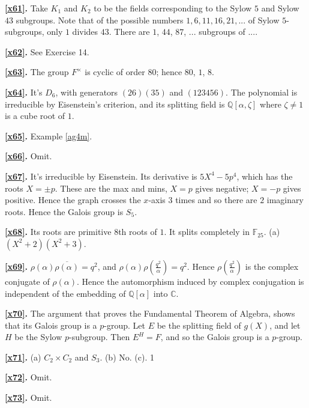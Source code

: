 \documentclass[a4paper,11pt,final,openany]{memoir}
\theoremstyle{nonumberplain}
\begin{document}
\medskip\noindent\textbf{\ref{x61}.} Take $K_{1}$ and $K_{2}$ to be the fields
corresponding to the Sylow $5$ and Sylow $43$ subgroups. Note that of the
possible numbers $1,6,11,16,21,...$ of Sylow $5$-subgroups, only $1$ divides
$43$. There are $1$, $44$, $87$, ... subgroups of ....

\medskip\noindent\textbf{\ref{x62}.} See Exercise 14.

\medskip\noindent\textbf{\ref{x63}.} The group $F^{\times}$ is cyclic of order
$80$; hence $80$, $1$, $8$.

\medskip\noindent\textbf{\ref{x64}.} It's $D_{6}$, with generators $(26)(35)$
and $(123456)$. The polynomial is irreducible by Eisenstein's criterion, and
its splitting field is ${\mathbb{Q}}[\alpha,\zeta]$ where $\zeta\neq1$ is a
cube root of $1$.

\medskip\noindent\textbf{\ref{x65}.} Example \ref{ag4m}.

\medskip\noindent\textbf{\ref{x66}.} Omit.

\medskip\noindent\textbf{\ref{x67}.} It's irreducible by Eisenstein. Its
derivative is $5X^{4}-5p^{4}$, which has the roots $X=\pm p$. These are the
max and mins, $X=p$ gives negative; $X=-p$ gives positive. Hence the graph
crosses the $x$-axis $3$ times and so there are $2$ imaginary roots. Hence the
Galois group is $S_{5}$.

\medskip\noindent\textbf{\ref{x68}.} Its roots are primitive $8$th roots of
$1$. It splits completely in $\mathbb{F}_{25}$. (a) $(X^{2}+2)(X^{2}+3)$.

\medskip\noindent\textbf{\ref{x69}.} $\rho(\alpha)\overline{\rho(\alpha
)}=q^{2}$, and $\rho(\alpha)\rho(\frac{q^{2}}{\alpha})=q^{2}$. Hence
$\rho(\frac{q^{2}}{\alpha})$ is the complex conjugate of $\rho(\alpha)$. Hence
the automorphism induced by complex conjugation is independent of the
embedding of ${\mathbb{Q}}[\alpha]$ into $\mathbb{C}$.

\medskip\noindent\textbf{\ref{x70}.} The argument that proves the Fundamental
Theorem of Algebra, shows that its Galois group is a $p$-group. Let $E$ be the
splitting field of $g(X)$, and let $H$ be the Sylow $p$-subgroup. Then
$E^{H}=F$, and so the Galois group is a $p$-group.

\medskip\noindent\textbf{\ref{x71}.} (a) $C_{2}\times C_{2}$ and $S_{3}$. (b)
No. (c). 1

\medskip\noindent\textbf{\ref{x72}.} Omit.

\medskip\noindent\textbf{\ref{x73}.} Omit.
\end{document}
